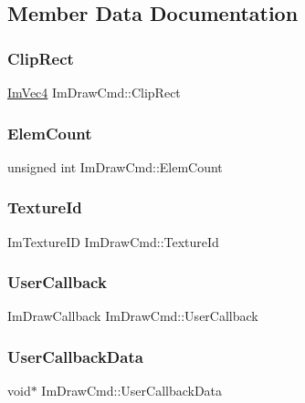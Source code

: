 \subsection{Member Data Documentation}
\hypertarget{struct_im_draw_cmd_a838918f420ff81cb8dc7265077592daa}{}\label{struct_im_draw_cmd_a838918f420ff81cb8dc7265077592daa} 
\subsubsection{\texorpdfstring{Clip\+Rect}{ClipRect}}
{\footnotesize\ttfamily \hyperlink{struct_im_vec4}{Im\+Vec4} Im\+Draw\+Cmd\+::\+Clip\+Rect}

\hypertarget{struct_im_draw_cmd_aafe2532964fb1f6905d67d84dd3e8730}{}\label{struct_im_draw_cmd_aafe2532964fb1f6905d67d84dd3e8730} 
\subsubsection{\texorpdfstring{Elem\+Count}{ElemCount}}
{\footnotesize\ttfamily unsigned int Im\+Draw\+Cmd\+::\+Elem\+Count}

\hypertarget{struct_im_draw_cmd_a4f3b5985ece9ca6b71e7a8e7d85a82e5}{}\label{struct_im_draw_cmd_a4f3b5985ece9ca6b71e7a8e7d85a82e5} 
\subsubsection{\texorpdfstring{Texture\+Id}{TextureId}}
{\footnotesize\ttfamily Im\+Texture\+ID Im\+Draw\+Cmd\+::\+Texture\+Id}

\hypertarget{struct_im_draw_cmd_ad26dac4e939f5c4bb892cbca0f9e3af8}{}\label{struct_im_draw_cmd_ad26dac4e939f5c4bb892cbca0f9e3af8} 
\subsubsection{\texorpdfstring{User\+Callback}{UserCallback}}
{\footnotesize\ttfamily Im\+Draw\+Callback Im\+Draw\+Cmd\+::\+User\+Callback}

\hypertarget{struct_im_draw_cmd_ae2f5a0baf4a0b25942237b8ce6adb42d}{}\label{struct_im_draw_cmd_ae2f5a0baf4a0b25942237b8ce6adb42d} 
\subsubsection{\texorpdfstring{User\+Callback\+Data}{UserCallbackData}}
{\footnotesize\ttfamily void$\ast$ Im\+Draw\+Cmd\+::\+User\+Callback\+Data}

